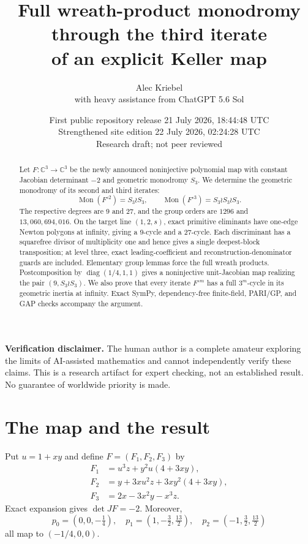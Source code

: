 \documentclass[11pt]{article}
\title{Full wreath-product monodromy through the third iterate\\
of an explicit Keller map}
\author{Alec Kriebel\\[2pt]\large with heavy assistance from ChatGPT 5.6 Sol}
\date{First public repository release 21 July 2026, 18:44:48 UTC\\
Strengthened site edition 22 July 2026, 02:24:28 UTC\\
Research draft; not peer reviewed}
\newcommand{\C}{\mathbb C}
\newcommand{\Mon}{\operatorname{Mon}}
\begin{document}
\maketitle

\begin{abstract}
Let $F:\C^3\to\C^3$ be the newly announced noninjective polynomial map with
constant Jacobian determinant $-2$ and geometric monodromy $S_3$. We determine
the geometric monodromy of its second and third iterates:
\[
  \Mon(F^{\circ2})=S_3\wr S_3,
  \qquad
  \Mon(F^{\circ3})=S_3\wr S_3\wr S_3.
\]
The respective degrees are 9 and 27, and the group orders are $1296$ and
$13{,}060{,}694{,}016$. On the target line $(1,2,s)$, exact primitive
eliminants have one-edge Newton polygons at infinity, giving a 9-cycle and a
27-cycle. Each discriminant has a squarefree divisor of multiplicity one and
hence gives a single deepest-block transposition; at level three, exact
leading-coefficient and reconstruction-denominator guards are included.
Elementary group lemmas force the full wreath products.
Postcomposition by $\operatorname{diag}(1/4,1,1)$ gives a noninjective
unit-Jacobian map realizing the pair $(9,S_3\wr S_3)$. We also prove that every
iterate $F^{\circ m}$ has a full $3^m$-cycle in its geometric inertia at
infinity. Exact SymPy, dependency-free finite-field, PARI/GP, and GAP checks
accompany the argument.
\end{abstract}

\noindent\textbf{Verification disclaimer.}
The human author is a complete amateur exploring the limits of AI-assisted
mathematics and cannot independently verify these claims. This is a research
artifact for expert checking, not an established result. No guarantee of
worldwide priority is made.

\section{The map and the result}

Put $u=1+xy$ and define $F=(F_1,F_2,F_3)$ by
\begin{align}
F_1&=u^3z+y^2u(4+3xy),\nonumber\\
F_2&=y+3xu^2z+3xy^2(4+3xy),\label{eq:F}\\
F_3&=2x-3x^2y-x^3z.\nonumber
\end{align}
Exact expansion gives $\det JF=-2$. Moreover,
\begin{equation}
p_0=(0,0,-\tfrac14),\quad
p_1=(1,-\tfrac32,\tfrac{13}2),\quad
p_2=(-1,\tfrac32,\tfrac{13}2)
\label{eq:points}
\end{equation}
all map to $(-1/4,0,0)$.
\end{document}

